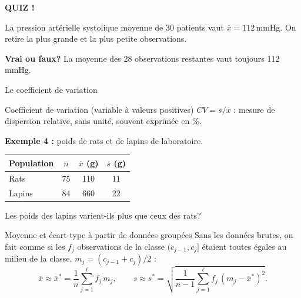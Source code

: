 \documentclass{BeamerTemplate}
\begin{document}
\begin{frame}[plain,t]
  \centerline{\LARGE\bfseries\alert{QUIZ !}}

  \medskip
  La pression artérielle systolique moyenne de 30 patients vaut
  $\overline{x} = 112$\,mmHg. On retire la plus grande et la plus petite
  observations.

  \bigskip
  \textbf{Vrai ou faux?} La moyenne des 28 observations restantes vaut
  toujours 112\,mmHg.

  \vspace{3cm}
\end{frame}

\begin{frame}[t]{Le coefficient de variation}
  \begin{Boite}{Coefficient de variation (variable à valeurs positives)}
    $CV = s/\overline{x}$ : mesure de dispersion \alert{relative}, sans unité,
    souvent exprimée en \%.
  \end{Boite}

  \textbf{Exemple 4 :} poids de rats et de lapins de laboratoire.
  \begin{center}
  \small
  \begin{tabular}{lccc}
    \toprule
    Population & $n$ & $\overline{x}$ (g) & $s$ (g) \\
    \midrule
    Rats   & 75 & 110 & 11 \\
    Lapins & 84 & 660 & 22 \\
    \bottomrule
  \end{tabular}
  \end{center}
  Les poids des lapins varient-ils plus que ceux des rats?

\end{frame}

\begin{frame}[t]{Moyenne et écart-type à partir de données groupées}
  Sans les données brutes, on fait comme si les $f_j$ observations de la classe
  $(c_{j-1}, c_j]$ étaient toutes égales au \alert{milieu} de la classe,
  $m_j = (c_{j-1} + c_j)/2$ :
  \[
    \overline{x} \approx \overline{x}^* = \frac{1}{n} \sum_{j=1}^{\ell} f_j\, m_j,
    \qquad
    s \approx s^* = \sqrt{\frac{1}{n-1} \sum_{j=1}^{\ell} f_j\,(m_j - \overline{x}^*)^2}.
  \]

\end{frame}
\end{document}
